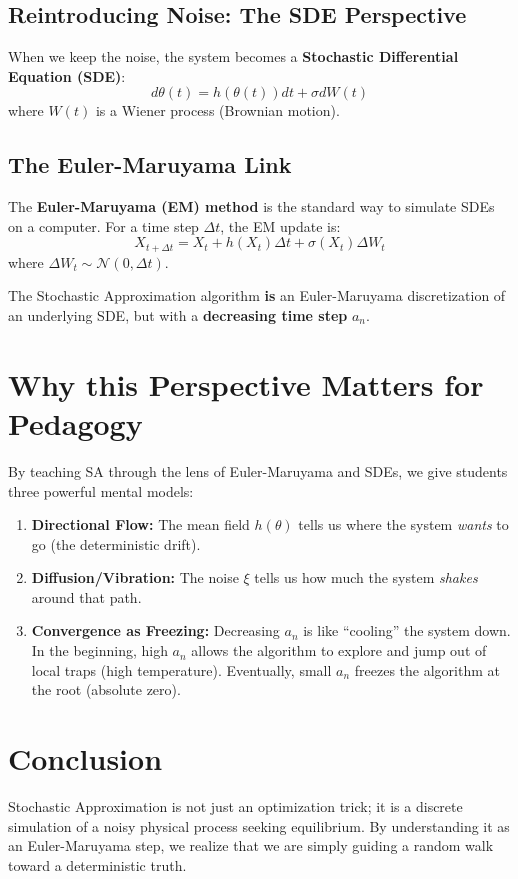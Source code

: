 \documentclass[11pt]{article}
\begin{document}
\subsection{Reintroducing Noise: The SDE Perspective}
When we keep the noise, the system becomes a \textbf{Stochastic Differential Equation (SDE)}:
\begin{equation}
    d\theta(t) = h(\theta(t)) dt + \sigma dW(t)
\end{equation}
where $W(t)$ is a Wiener process (Brownian motion). 

\subsection{The Euler-Maruyama Link}
The \textbf{Euler-Maruyama (EM) method} is the standard way to simulate SDEs on a computer. For a time step $\Delta t$, the EM update is:
\begin{equation}
    X_{t+\Delta t} = X_t + h(X_t) \Delta t + \sigma(X_t) \Delta W_t
\end{equation}
where $\Delta W_t \sim \mathcal{N}(0, \Delta t)$. 

\begin{tcolorbox}[title=The Deep Connection]
The Stochastic Approximation algorithm \textbf{is} an Euler-Maruyama discretization of an underlying SDE, but with a \textbf{decreasing time step} $a_n$. 
\end{tcolorbox}

\section{Why this Perspective Matters for Pedagogy}

By teaching SA through the lens of Euler-Maruyama and SDEs, we give students three powerful mental models:
\begin{enumerate}
    \item \textbf{Directional Flow:} The mean field $h(\theta)$ tells us where the system \textit{wants} to go (the deterministic drift).
    \item \textbf{Diffusion/Vibration:} The noise $\xi$ tells us how much the system \textit{shakes} around that path.
    \item \textbf{Convergence as Freezing:} Decreasing $a_n$ is like ``cooling'' the system down. In the beginning, high $a_n$ allows the algorithm to explore and jump out of local traps (high temperature). Eventually, small $a_n$ freezes the algorithm at the root (absolute zero).
\end{enumerate}

\section{Conclusion}
Stochastic Approximation is not just an optimization trick; it is a discrete simulation of a noisy physical process seeking equilibrium. By understanding it as an Euler-Maruyama step, we realize that we are simply guiding a random walk toward a deterministic truth.
\end{document}
